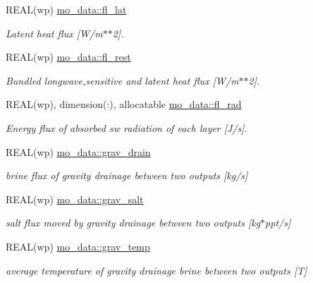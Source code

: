 \begin{DoxyCompactItemize}
REAL(wp) \hyperlink{namespacemo__data_a63a4e3f74d04640c4f4522a9f22390e0}{mo\_\-data::fl\_\-lat}
\begin{DoxyCompactList}\small\item\em Latent heat flux \mbox{[}W/m$\ast$$\ast$2\mbox{]}. \item\end{DoxyCompactList}\item 
REAL(wp) \hyperlink{namespacemo__data_afedf60f1ea1272e55a3d6110e0911102}{mo\_\-data::fl\_\-rest}
\begin{DoxyCompactList}\small\item\em Bundled longwave,sensitive and latent heat flux \mbox{[}W/m$\ast$$\ast$2\mbox{]}. \item\end{DoxyCompactList}\item 
REAL(wp), dimension(:), allocatable \hyperlink{namespacemo__data_aac6756d0384948c5717bdbabb4e1b748}{mo\_\-data::fl\_\-rad}
\begin{DoxyCompactList}\small\item\em Energy flux of absorbed sw radiation of each layer \mbox{[}J/s\mbox{]}. \item\end{DoxyCompactList}\item 
REAL(wp) \hyperlink{namespacemo__data_a7971f5dbfdde936f63647492b31dffe9}{mo\_\-data::grav\_\-drain}
\begin{DoxyCompactList}\small\item\em brine flux of gravity drainage between two outputs \mbox{[}kg/s\mbox{]} \item\end{DoxyCompactList}\item 
REAL(wp) \hyperlink{namespacemo__data_a084bb9d2856cdd8a9253f7790ac09b66}{mo\_\-data::grav\_\-salt}
\begin{DoxyCompactList}\small\item\em salt flux moved by gravity drainage between two outputs \mbox{[}kg$\ast$ppt/s\mbox{]} \item\end{DoxyCompactList}\item 
REAL(wp) \hyperlink{namespacemo__data_afd51dbc5cf51bbdec73b0c543d963da8}{mo\_\-data::grav\_\-temp}
\begin{DoxyCompactList}\small\item\em average temperature of gravity drainage brine between two outputs \mbox{[}T\mbox{]} \item\end{DoxyCompactList}\item 

\end{DoxyCompactItemize}
